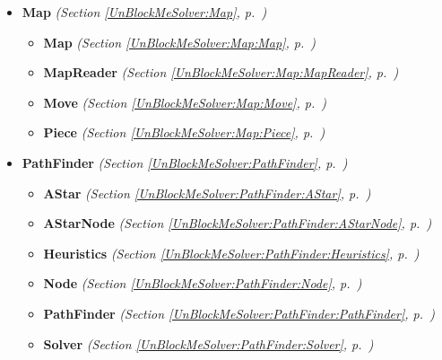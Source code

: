 \begin{itemize}
\setlength{\parskip}{0ex}
\item \textbf{Map}
  \textit{(Section \ref{UnBlockMeSolver:Map}, p.~\pageref{UnBlockMeSolver:Map})}

  \begin{itemize}
\setlength{\parskip}{0ex}
    \item \textbf{Map}
  \textit{(Section \ref{UnBlockMeSolver:Map:Map}, p.~\pageref{UnBlockMeSolver:Map:Map})}

    \item \textbf{MapReader}
  \textit{(Section \ref{UnBlockMeSolver:Map:MapReader}, p.~\pageref{UnBlockMeSolver:Map:MapReader})}

    \item \textbf{Move}
  \textit{(Section \ref{UnBlockMeSolver:Map:Move}, p.~\pageref{UnBlockMeSolver:Map:Move})}

    \item \textbf{Piece}
  \textit{(Section \ref{UnBlockMeSolver:Map:Piece}, p.~\pageref{UnBlockMeSolver:Map:Piece})}

  \end{itemize}
\item \textbf{PathFinder}
  \textit{(Section \ref{UnBlockMeSolver:PathFinder}, p.~\pageref{UnBlockMeSolver:PathFinder})}

  \begin{itemize}
\setlength{\parskip}{0ex}
    \item \textbf{AStar}
  \textit{(Section \ref{UnBlockMeSolver:PathFinder:AStar}, p.~\pageref{UnBlockMeSolver:PathFinder:AStar})}

    \item \textbf{AStarNode}
  \textit{(Section \ref{UnBlockMeSolver:PathFinder:AStarNode}, p.~\pageref{UnBlockMeSolver:PathFinder:AStarNode})}

    \item \textbf{Heuristics}
  \textit{(Section \ref{UnBlockMeSolver:PathFinder:Heuristics}, p.~\pageref{UnBlockMeSolver:PathFinder:Heuristics})}

    \item \textbf{Node}
  \textit{(Section \ref{UnBlockMeSolver:PathFinder:Node}, p.~\pageref{UnBlockMeSolver:PathFinder:Node})}

    \item \textbf{PathFinder}
  \textit{(Section \ref{UnBlockMeSolver:PathFinder:PathFinder}, p.~\pageref{UnBlockMeSolver:PathFinder:PathFinder})}

    \item \textbf{Solver}
  \textit{(Section \ref{UnBlockMeSolver:PathFinder:Solver}, p.~\pageref{UnBlockMeSolver:PathFinder:Solver})}


\end{itemize}
\end{itemize}
